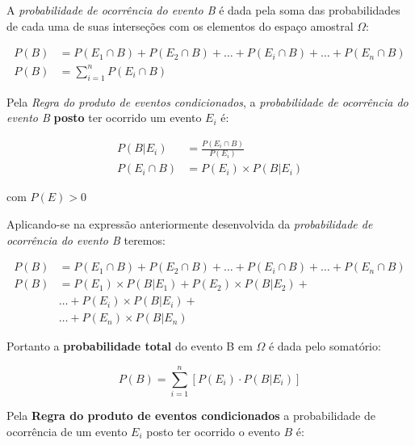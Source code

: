 \documentclass[
]{book}
\begin{document}
\hfill\break

A \emph{probabilidade de ocorrência do evento B} é dada pela soma das probabilidades de cada uma de suas interseções com os elementos do espaço amostral \(\Omega\):

\hfill\break

\begin{align*}
P(B) & = P(E_{1} \cap B) + P(E_{2} \cap B) + \dots + P(E_{i} \cap B) + \dots  + P(E_{n} \cap B) \\
P(B) & = \sum _{i=1}^{n}P\left({E}_{i}\cap B\right)
\end{align*}

\hfill\break

Pela \emph{Regra do produto de eventos condicionados}, a \emph{probabilidade de ocorrência do evento B} \textbf{posto} ter ocorrido um evento \(E_{i}\) é:

\hfill\break

\begin{align*}
P(B|E_{i}) & = \frac{P(E_{i}\cap B)}{P(E_{i})} \\ 
P(E_{i}\cap B) & = P(E_{i}) \times P(B|E_{i}) 
\end{align*}

\hfill\break

com \(P(E) > 0\)

\hfill\break

Aplicando-se na expressão anteriormente desenvolvida da \emph{probabilidade de ocorrência do evento B} teremos:

\hfill\break
\begin{align*}
P(B) & = P(E_{1} \cap B) + P(E_{2} \cap B) + \dots + P(E_{i} \cap B) + \dots  + P(E_{n} \cap B) \\
P(B) & = P(E_{1}) \times P(B|E_{1}) + P(E_{2}) \times P(B|E_{2}) + \\
    & \dots +P(E_{i}) \times P(B|E_{i}) + \\
    & \dots  + P(E_{n}) \times P(B|E_{n}) 
\end{align*}

\hfill\break

Portanto a \textbf{probabilidade total} do evento B em \(\Omega\) é dada pelo somatório:

\hfill\break

\[
P(B) = \sum _{i=1}^{n}\left[P\left({E}_{i}\right)\cdot P\left(B|{E}_{i}\right)\right]
\]

\hfill\break

Pela \textbf{Regra do produto de eventos condicionados} a probabilidade de ocorrência de um evento \(E_{i}\) posto ter ocorrido o evento \(B\) é:
\end{document}
